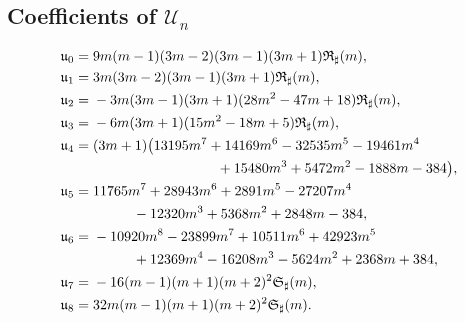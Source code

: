 \documentclass[11pt,a4paper]{article}
\numberwithin{equation}{section}
\theoremstyle{definition}\newtheorem{definition}[theorem]{Definition}
\theoremstyle{remark}\newtheorem{remark}[theorem]{Remark}
\begin{document}
\subsection{Coefficients of \texorpdfstring{$\mathscr U_n$}{U-n}}
\begin{align*}
\mathfrak u_0={}&9m(m-1)(3m-2)(3m-1)(3m+1)\mathfrak R_\sharp(m),\\
\mathfrak u_1={}&3m(3m-2)(3m-1)(3m+1)\mathfrak R_\sharp(m),\\
\mathfrak u_2={}&-3m(3m-1)(3m+1)(28m^2-47m+18)\mathfrak R_\sharp(m),\\
\mathfrak u_3={}&-6m(3m+1)(15m^2-18m+5)\mathfrak R_\sharp(m),\\
\mathfrak u_4={}&(3m+1)\bigl(13195m^7+14169m^6-32535m^5-19461m^4\\
 &\hspace{31mm}+15480m^3+5472m^2-1888m-384\bigr),\\
\mathfrak u_5={}&11765m^7+28943m^6+2891m^5-27207m^4\\
 &\hspace{10mm}-12320m^3+5368m^2+2848m-384,\\
\mathfrak u_6={}&-10920m^8-23899m^7+10511m^6+42923m^5\\
 &\hspace{10mm}+12369m^4-16208m^3-5624m^2+2368m+384,\\
\mathfrak u_7={}&-16(m-1)(m+1)(m+2)^2\mathfrak S_\sharp(m),\\
\mathfrak u_8={}&32m(m-1)(m+1)(m+2)^2\mathfrak S_\sharp(m).
\end{align*}
\end{document}
